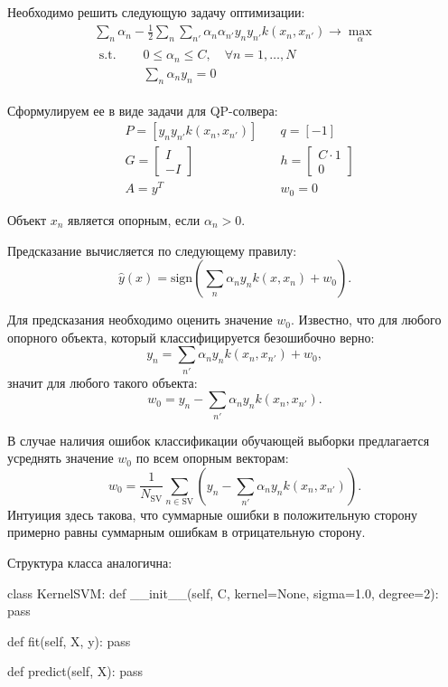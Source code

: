\documentclass[a4paper,12pt]{article}
\begin{document}
Необходимо решить следующую задачу оптимизации:
\begin{gather}
    \sum_{n} \alpha_n - \frac{1}{2}\sum_{n}\sum_{n'} \alpha_{n}\alpha_{n'} y_{n}y_{n'} k(x_{n}, x_{n'}) \to \max_{\alpha} \\
    \begin{aligned}
        \text{s.t. } \quad  
        & 0 \le \alpha_n \le C, \quad \forall n = 1, \dots, N \\
        & \sum_{n} \alpha_n y_n = 0
    \end{aligned}
\end{gather}

Сформулируем ее в виде задачи для QP-солвера:
$$
\begin{aligned}
    &P = \left[ y_{n}y_{n'}k(x_{n}, x_{n'}) \right] \quad
    &q = \left[ -1 \right] \\
    &G = \left[ \begin{array}{c} I \\ \hline -I \end{array} \right] \quad
    &h = \left[ \begin{array}{c} C\cdot 1 \\ \hline 0 \end{array} \right] \\
    &A = y^T\quad
    &w_0 = 0
\end{aligned}
$$

Объект $x_n$ является опорным, если $\alpha_n > 0$.

Предсказание вычисляется по следующему правилу:
$$\hat{y}(x) = \text{sign}\left(\sum_{n}\alpha_{n}y_{n}k(x, x_{n}) + w_0\right).$$

Для предсказания необходимо оценить значение $w_0$. Известно, что для любого опорного объекта, который классифицируется безошибочно верно:
$$y_n = \sum_{n'}\alpha_{n}y_{n}k(x_{n}, x_{n'}) + w_0,$$
значит для любого такого объекта:
$$w_0 = y_n - \sum_{n'}\alpha_{n}y_{n}k(x_{n}, x_{n'}).$$

В случае наличия ошибок классификации обучающей выборки предлагается усреднять значение $w_0$ по всем опорным векторам:
$$w_0 = \frac{1}{N_\text{SV}}\sum_{n \in \text{SV}}\left(y_n - \sum_{n'}\alpha_{n}y_{n}k(x_{n}, x_{n'})\right).$$
Интуиция здесь такова, что суммарные ошибки в положительную сторону примерно равны суммарным ошибкам в отрицательную сторону.

Структура класса аналогична:
\begin{python3}
class KernelSVM:
    def __init__(self, C, kernel=None, sigma=1.0, degree=2):
        pass
    
    def fit(self, X, y):
        pass
    
    def predict(self, X):
        pass
\end{python3}
\end{document}
